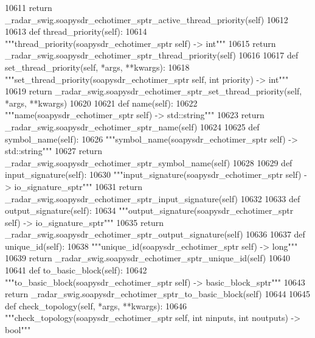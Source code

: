 \begin{DoxyCode}
{{{{{{{{{{{{{{{{{{{{{{{{{{{{{{{{{10611         \textcolor{keywordflow}{return} \_radar\_swig.soapysdr\_echotimer\_sptr\_active\_thread\_priority(self)
10612 
10613     \textcolor{keyword}{def }thread_priority(self):
10614         \textcolor{stringliteral}{"""thread\_priority(soapysdr\_echotimer\_sptr self) -> int"""}
10615         \textcolor{keywordflow}{return} \_radar\_swig.soapysdr\_echotimer\_sptr\_thread\_priority(self)
10616 
10617     \textcolor{keyword}{def }set_thread_priority(self, *args, **kwargs):
10618         \textcolor{stringliteral}{"""set\_thread\_priority(soapysdr\_echotimer\_sptr self, int priority) -> int"""}
10619         \textcolor{keywordflow}{return} \_radar\_swig.soapysdr\_echotimer\_sptr\_set\_thread\_priority(self, *args, **kwargs)
10620 
10621     \textcolor{keyword}{def }name(self):
10622         \textcolor{stringliteral}{"""name(soapysdr\_echotimer\_sptr self) -> std::string"""}
10623         \textcolor{keywordflow}{return} \_radar\_swig.soapysdr\_echotimer\_sptr\_name(self)
10624 
10625     \textcolor{keyword}{def }symbol_name(self):
10626         \textcolor{stringliteral}{"""symbol\_name(soapysdr\_echotimer\_sptr self) -> std::string"""}
10627         \textcolor{keywordflow}{return} \_radar\_swig.soapysdr\_echotimer\_sptr\_symbol\_name(self)
10628 
10629     \textcolor{keyword}{def }input_signature(self):
10630         \textcolor{stringliteral}{"""input\_signature(soapysdr\_echotimer\_sptr self) -> io\_signature\_sptr"""}
10631         \textcolor{keywordflow}{return} \_radar\_swig.soapysdr\_echotimer\_sptr\_input\_signature(self)
10632 
10633     \textcolor{keyword}{def }output_signature(self):
10634         \textcolor{stringliteral}{"""output\_signature(soapysdr\_echotimer\_sptr self) -> io\_signature\_sptr"""}
10635         \textcolor{keywordflow}{return} \_radar\_swig.soapysdr\_echotimer\_sptr\_output\_signature(self)
10636 
10637     \textcolor{keyword}{def }unique_id(self):
10638         \textcolor{stringliteral}{"""unique\_id(soapysdr\_echotimer\_sptr self) -> long"""}
10639         \textcolor{keywordflow}{return} \_radar\_swig.soapysdr\_echotimer\_sptr\_unique\_id(self)
10640 
10641     \textcolor{keyword}{def }to_basic_block(self):
10642         \textcolor{stringliteral}{"""to\_basic\_block(soapysdr\_echotimer\_sptr self) -> basic\_block\_sptr"""}
10643         \textcolor{keywordflow}{return} \_radar\_swig.soapysdr\_echotimer\_sptr\_to\_basic\_block(self)
10644 
10645     \textcolor{keyword}{def }check_topology(self, *args, **kwargs):
10646         \textcolor{stringliteral}{"""check\_topology(soapysdr\_echotimer\_sptr self, int ninputs, int noutputs) -> bool"""}
}}}}}}}}}}}}}}}}}}}}}}}}}}}}}}}}}
\end{DoxyCode}
